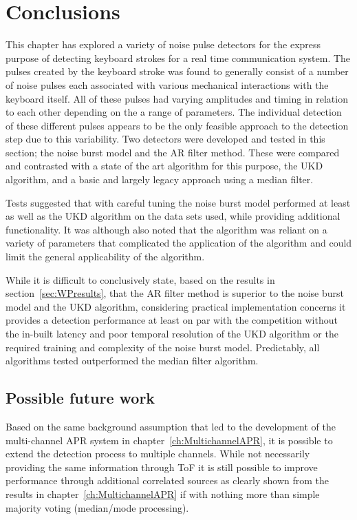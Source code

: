 \section{Conclusions}\label{sec:WPconclusions}

This chapter has explored a variety of noise pulse detectors for the express purpose of detecting keyboard strokes for a real time communication system. The pulses created by the keyboard stroke was found to generally consist of a number of noise pulses each associated with various mechanical interactions with the keyboard itself. All of these pulses had varying amplitudes and timing in relation to each other depending on the a range of parameters. The individual detection of these different pulses appears to be the only feasible approach to the detection step due to this variability. Two detectors were developed and tested in this section; the noise burst model and the AR filter method. These were compared and contrasted with a state of the art algorithm for this purpose, the UKD algorithm\cite{Subramanya2007}, and a basic and largely legacy approach using a median filter.

Tests suggested that with careful tuning the noise burst model performed at least as well as the UKD algorithm on the data sets used, while providing additional functionality. It was although also noted that the algorithm was reliant on a variety of parameters that complicated the application of the algorithm and could limit the general applicability of the algorithm.

While it is difficult to conclusively state, based on the results in section~\ref{sec:WPresults}, that the AR filter method is superior to the noise burst model and the UKD algorithm, considering practical implementation concerns it provides a detection performance at least on par with the competition without the in-built latency and poor temporal resolution of the UKD algorithm or the required training and complexity of the noise burst model. Predictably, all algorithms tested outperformed the median filter algorithm.

\subsection{Possible future work}
Based on the same background assumption that led to the development of the multi-channel APR system in chapter~\ref{ch:MultichannelAPR}, it is possible to extend the detection process to multiple channels. While not necessarily providing the same information through ToF it is still possible to improve performance through additional correlated sources as clearly shown from the results in chapter~\ref{ch:MultichannelAPR} if with nothing more than simple majority voting (median/mode processing).

